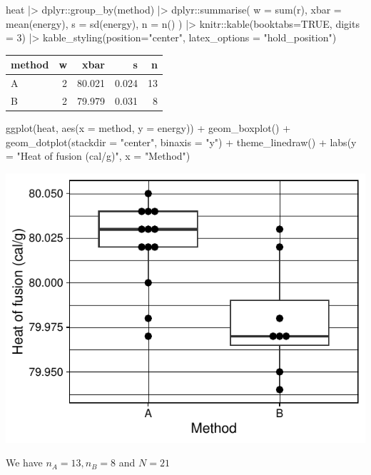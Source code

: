 \documentclass[a4paper]{article}\usepackage[]{graphicx}\usepackage[]{xcolor}
\makeatletter
\def\maxwidth{ %
  \ifdim\Gin@nat@width>\linewidth
    \linewidth
  \else
    \Gin@nat@width
  \fi
}
\makeatother
\begin{document}
\begin{Schunk}
\begin{Sinput}
heat |>
dplyr::group_by(method) |> 
dplyr::summarise(
  w = sum(r),
  xbar = mean(energy),
  s = sd(energy),
  n = n()
) |> 
knitr::kable(booktabs=TRUE, digits = 3) |>
 kable_styling(position="center", latex_options = "hold_position")
\end{Sinput}
\begin{table}[!h]
\centering
\begin{tabular}{lrrrr}
\toprule
method & w & xbar & s & n\\
\midrule
A & 2 & 80.021 & 0.024 & 13\\
B & 2 & 79.979 & 0.031 & 8\\
\bottomrule
\end{tabular}
\end{table}

\begin{Sinput}
ggplot(heat, aes(x = method, y = energy)) + 
  geom_boxplot() + 
  geom_dotplot(stackdir = "center", 
    binaxis = "y") +
  theme_linedraw() + 
  labs(y = "Heat of fusion (cal/g)",
       x = "Method")
\end{Sinput}


{\centering \includegraphics[width=\maxwidth]{figure/listings-unnamed-chunk-123-1} 

}

\end{Schunk}
We have \( n_A = 13, n_B = 8 \) and \( N = 21 \)
\end{document}
